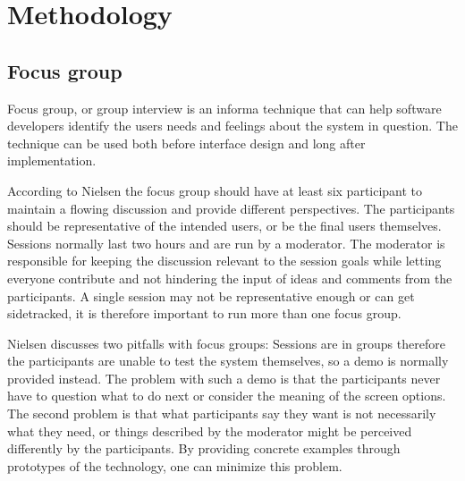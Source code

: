 \chapter{Methodology} %

\label{Chapter4} %



\section{Focus group}
Focus group, or group interview is an informa technique that can help software developers identify the users needs and feelings about the system in question. The technique can be used both before interface design and long after implementation. 

According to Nielsen the focus group should have at least six participant to maintain a flowing discussion and provide different perspectives. The participants should be representative of the intended users, or be the final users themselves. Sessions normally last two hours and are run by a moderator. The moderator is responsible for keeping the discussion relevant to the session goals while letting everyone contribute and not hindering the input of ideas and comments from the participants. %
A single session may not be representative enough or can get sidetracked, it is therefore important to run more than one focus group.

Nielsen discusses two pitfalls with focus groups: Sessions are in groups therefore the participants are unable to test the system themselves, so a demo is normally provided instead. The problem with such a demo is that the participants never have to question what to do next or consider the meaning of the screen options. The second problem is that what participants say they want is not necessarily what they need, or things described by the moderator might be perceived differently by the participants. By providing concrete examples through prototypes of the technology, one can minimize this problem.